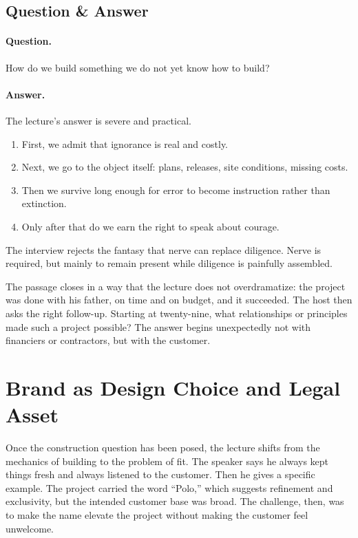 \subsection{Question \& Answer}

\paragraph{Question.}
How do we build something we do not yet know how to build?

\paragraph{Answer.}
The lecture's answer is severe and practical.
\begin{enumerate}
\item First, we admit that ignorance is real and costly.
\item Next, we go to the object itself: plans, releases, site conditions, missing costs.
\item Then we survive long enough for error to become instruction rather than extinction.
\item Only after that do we earn the right to speak about courage.
\end{enumerate}
The interview rejects the fantasy that nerve can replace diligence. Nerve is required, but mainly to remain present while diligence is painfully assembled.

The passage closes in a way that the lecture does not overdramatize: the project was done with his father, on time and on budget, and it succeeded. The host then asks the right follow-up. Starting at twenty-nine, what relationships or principles made such a project possible? The answer begins unexpectedly not with financiers or contractors, but with the customer.

\section{Brand as Design Choice and Legal Asset}

Once the construction question has been posed, the lecture shifts from the mechanics of building to the problem of fit. The speaker says he always kept things fresh and always listened to the customer. Then he gives a specific example. The project carried the word ``Polo,'' which suggests refinement and exclusivity, but the intended customer base was broad. The challenge, then, was to make the name elevate the project without making the customer feel unwelcome.

